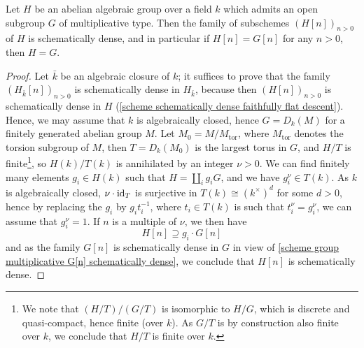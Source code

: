 \begin{lemma}\label{scheme alg group open multiplicative subgroup torsion dense}
Let $H$ be an abelian algebraic group over a field $k$ which admits an open subgroup $G$ of multiplicative type. Then the family of subschemes $(H[n])_{n>0}$ of $H$ is schematically dense, and in particular if $H[n]=G[n]$ for any $n>0$, then $H=G$.
\end{lemma}
\begin{proof}
Let $\bar{k}$ be an algebraic closure of $k$; it suffices to prove that the family $(H_{\bar{k}}[n])_{n>0}$ is schematically dense in $H_{\bar{k}}$, because then $(H[n])_{n>0}$ is schematically dense in $H$ (\cref{scheme schematically dense faithfully flat descent}). Hence, we may assume that $k$ is algebraically closed, hence $G=D_k(M)$ for a finitely generated abelian group $M$. Let $M_0=M/M_{\mathrm{tor}}$, where $M_{\mathrm{tor}}$ denotes the torsion subgroup of $M$, then $T=D_k(M_0)$ is the largest torus in $G$, and $H/T$ is finite\footnote{We note that $(H/T)/(G/T)$ is isomorphic to $H/G$, which is discrete and quasi-compact, hence finite (over $k$). As $G/T$ is by construction also finite over $k$, we conclude that $H/T$ is finite over $k$.}, so $H(k)/T(k)$ is annihilated by an integer $\nu>0$. We can find finitely many elements $g_i\in H(k)$ such that $H=\coprod_ig_iG$, and we have $g_i^\nu\in T(k)$. As $k$ is algebraically closed, $\nu\cdot\operatorname{id}_T$ is surjective in $T(k)\cong (k^\times)^d$ for some $d>0$, hence by replacing the $g_i$ by $g_it_i^{-1}$, where $t_i\in T(k)$ is such that $t_i^\nu=g_i^\nu$, we can assume that $g_i^\nu=1$. If $n$ is a multiple of $\nu$, we then have
\[H[n]\supseteq g_i\cdot G[n]\]
and as the family $G[n]$ is schematically dense in $G$ in view of \cref{scheme group multiplicative G[n] schematically dense}, we conclude that $H[n]$ is schematically dense.
\end{proof}


